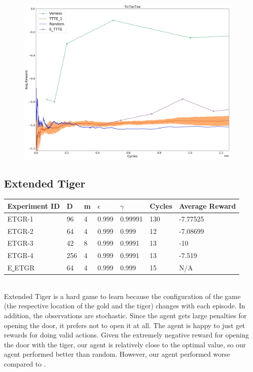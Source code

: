 \documentclass{article}
\theoremstyle{definition}
\newtheorem{primary statistics}[definition]{Primary Statistics}
\newtheorem{auxiliary statistics}[definition]{Auxiliary Statistics}
\begin{document}
 \begin{figure}[!htb]
 \centering
    \includegraphics[width=11.1cm]{TicTacToe}
\end{figure}


\newpage

\subsection{Extended Tiger}
 \begin{tabular}{|l|l|l|l|l|l|l|}
 \hline \centering
 Experiment ID& D & m & $\epsilon$ & $\gamma$ & Cycles & Average Reward \\ \hline
ETGR-1 & 96        & 4           & 0.999       & 0.99991           & 130    & -7.77525        \\ \hline
ETGR-2 & 64        & 4           & 0.999       & 0.999             & 12     & -7.08699       \\ \hline
ETGR-3 & 42        & 8           & 0.999       & 0.9991            & 13     & -10             \\ \hline
ETGR-4 & 256       & 4           & 0.999       & 0.9991            & 13     & -7.519  \\ \hline 
E\underline{ }ETGR & 64       & 4           & 0.999       & 0.999            & 15     & N/A  \\ \hline    
\end{tabular} \\

Extended Tiger is a hard game to learn because the configuration of the game (the respective location of the gold and the tiger) changes with each episode. In addition, the observations are stochastic. Since the agent gets large penalties for opening the door, it prefers not to open it at all. The agent is happy to just get rewards for doing valid actions. Given the extremely negative reward for opening the door with the tiger, our agent is relatively close to the optimal value, so our agent performed better than random. However, our agent performed worse compared to \cite{veness2011monte}.
\end{document}
